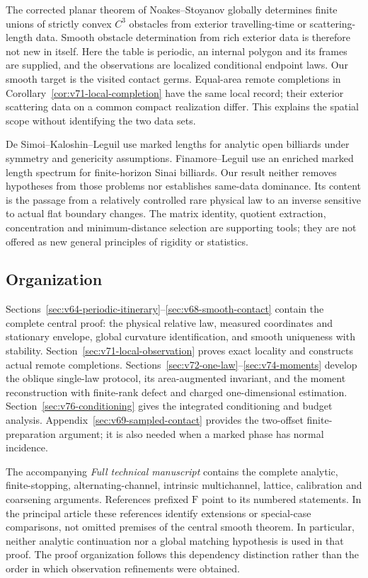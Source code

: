 The corrected planar theorem of Noakes--Stoyanov
\cite{NoakesStoyanov2020} globally determines finite unions of strictly
convex $C^3$ obstacles from exterior travelling-time or scattering-length
data.  Smooth obstacle determination from rich exterior data is therefore
not new in itself.  Here the table is periodic, an internal polygon and
its frames are supplied, and the observations are localized conditional
endpoint laws.  Our smooth target is the visited contact germs.
Equal-area remote completions in
Corollary~\ref{cor:v71-local-completion} have the same local record;
their exterior scattering data on a common compact realization differ.
This explains the spatial scope without identifying the two data sets.

De Simoi--Kaloshin--Leguil \cite{DSKL} use marked lengths for analytic
open billiards under symmetry and genericity assumptions.
Finamore--Leguil \cite{FinamoreLeguil} use an enriched marked length
spectrum for finite-horizon Sinai billiards.  Our result neither removes
hypotheses from those problems nor establishes same-data dominance.
Its content is the passage from a relatively controlled rare physical
law to an inverse sensitive to actual flat boundary changes.
The matrix identity, quotient extraction, concentration and
minimum-distance selection are supporting tools; they are not offered
as new general principles of rigidity or statistics.

\subsection{Organization}

Sections~\ref{sec:v64-periodic-itinerary}--\ref{sec:v68-smooth-contact}
contain the complete central proof: the physical relative law, measured
coordinates and stationary envelope, global curvature identification,
and smooth uniqueness with stability.  Section~\ref{sec:v71-local-observation}
proves exact locality and constructs actual remote completions.
Sections~\ref{sec:v72-one-law}--\ref{sec:v74-moments} develop the
oblique single-law protocol, its area-augmented invariant, and the
moment reconstruction with finite-rank defect and charged
one-dimensional estimation.  Section~\ref{sec:v76-conditioning} gives
the integrated conditioning and budget analysis.
Appendix~\ref{sec:v69-sampled-contact}
provides the two-offset finite-preparation argument; it is also needed
when a marked phase has normal incidence.

The accompanying \emph{Full technical manuscript} contains the complete
analytic, finite-stopping, alternating-channel, intrinsic multichannel,
lattice, calibration and coarsening arguments.  References prefixed
$\mathrm F$ point to its numbered statements.  In the principal article
these references identify extensions or special-case comparisons, not
omitted premises of the central smooth theorem.  In particular, neither
analytic continuation nor a global matching hypothesis is used in that
proof.  The proof organization follows this dependency distinction rather
than the order in which observation refinements were obtained.
